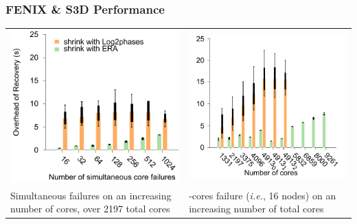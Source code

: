 \begin{frame}
  \frametitle{FENIX \& S3D Performance}
  \begin{tabular}{p{}p{}}
    \includegraphics[width=\linewidth]{s3d_scalability_1.pdf}
    &
    \includegraphics[width=\linewidth]{s3d_scalability_2_2.pdf}\\
    \centering Simultaneous failures on an increasing number of cores, over 2197
    total cores 
    &
     \centering 256-cores failure (\emph{i.e.}, 16 nodes) on an increasing number of
      total cores
  \end{tabular}
\end{frame}

